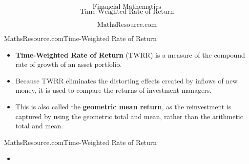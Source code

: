 \documentclass{beamer}
\begin{document}
\begin{frame}
\bigskip
{
\Huge
\[ \mbox{Financial Mathematics}  \]
\huge
\[ \mbox{Time-Weighted Rate of Return}  \]
}

{
\LARGE
\[ \mbox{MathsResource.com}  \]
}
\end{frame}
\begin{frame}{MathsResource.com}{Time-Weighted Rate of Return}
\Large
\begin{itemize}
\item \textbf{Time-Weighted Rate of Return} (TWRR) is
a measure of the compound rate of growth of an asset portfolio.

\item Because TWRR eliminates the distorting effects created by inflows of new money, it is used to compare the returns of investment managers. 

\item
This is also called the \textbf{geometric mean return}, as the reinvestment is captured by using the geometric total and mean, rather than the arithmetic total and mean.
\end{itemize}
\end{frame}
\begin{frame}{MathsResource.com}{Time-Weighted Rate of Return}
\Large
\begin{itemize}
\item
\end{itemize}
\end{frame}
\end{document}
